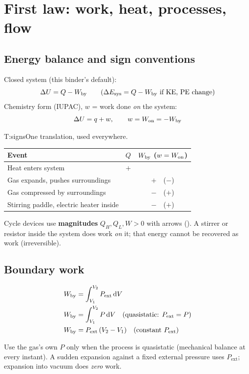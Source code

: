 \section{First law: work, heat, processes, flow}\label{sec:firstlaw}
\begin{multicols}{2}
\subsection{Energy balance and sign conventions}\label{sec:signs}
\CORE{}
\begin{formulabox}Closed system (this binder's default):
\begin{equation}
\Delta U = Q - W_{\mathrm{by}} \qquad(\Delta E_{\text{sys}}=Q-W_{\mathrm{by}} \text{ if KE, PE change}) \label{F:energy:closed}
\end{equation}
Chemistry form (IUPAC), $w$ = work done \emph{on} the system:
\begin{equation}
\Delta U=q+w,\qquad w=W_{\mathrm{on}}=-W_{\mathrm{by}} \label{F:energy:chem}
\end{equation}
\end{formulabox}
\begin{reftab}{T:signs}{One translation, used everywhere.}
\small
\begin{tabularx}{\linewidth}{@{}Ycc@{}}
\toprule
Event & $Q$ & $W_{\mathrm{by}}$ ($w=W_{\mathrm{on}}$)\\
\midrule
Heat enters system & $+$ & \\
Gas expands, pushes surroundings & & $+$\ \ ($-$)\\
Gas compressed by surroundings & & $-$\ \ ($+$)\\
Stirring paddle, electric heater inside & & $-$\ \ ($+$)\\
\bottomrule
\end{tabularx}\end{reftab}
Cycle devices use \textbf{magnitudes} $Q_H,Q_L,W>0$ with arrows (). A stirrer or resistor inside the system does work \emph{on} it; that energy cannot be recovered as work (irreversible).

\subsection{Boundary work}\label{sec:work}
\CORE{}
\begin{formulabox}
\vspace{-6pt}
\begin{align}
W_{\mathrm{by}} &= \int_{V_1}^{V_2} P_{\text{ext}}\,\mathrm{d} V \label{F:work:boundary}\\
W_{\mathrm{by}} &= \int_{V_1}^{V_2} P\,\mathrm{d} V \quad\text{(quasistatic: } P_{\text{ext}}=P\text{)} \label{F:work:rev}\\
W_{\mathrm{by}} &= P_{\text{ext}}\,(V_2-V_1)\quad\text{(constant } P_{\text{ext}}\text{)} \label{F:work:constP}
\end{align}
\end{formulabox}
Use the gas's own $P$ only when the process is quasistatic (mechanical balance at every instant). A sudden expansion against a fixed external pressure uses $P_{\text{ext}}$; expansion into vacuum does \emph{zero} work.


\end{multicols}
